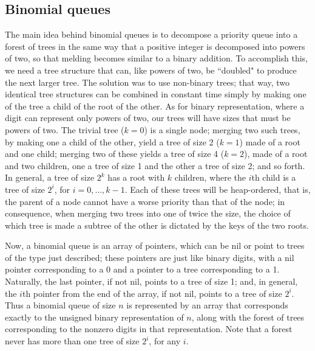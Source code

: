 \documentclass[11pt]{article}
\begin{document}
\subsection{Binomial queues}
The main idea behind binomial queues is to decompose a priority queue into
a forest of trees in the same way that a positive integer is decomposed into
powers of two, so that melding becomes similar to a binary addition.
To accomplish this, we need a tree structure that can, like powers of
two, be ``doubled" to produce the next larger tree.  The solution
was to use non-binary trees; that way, two identical tree structures
can be combined in constant time simply by making one of the tree a child
of the root of the other.  As for binary representation, where a digit
can represent only powers of two, our trees will have sizes that must be
powers of two.   The trivial tree ($k=0$) is a single node; merging two such
trees, by making one a child of the other, yield a tree of size 2 ($k=1$)
made of a root and one child; merging two of these yields a tree of size 4
($k=2$), made of a root and two children, one a tree of size 1 and the other
a tree of size 2; and so forth.  In general, a tree of size $2^k$ has a root
with $k$ children, where the $i$th child is a tree of size $2^i$,
for $i=0,\ldots,k-1$.  Each of these trees will be heap-ordered, that is,
the parent of a node cannot have a worse priority than that of the node;
in consequence, when merging two trees into one of twice the size, the choice
of which tree is made a subtree of the other is dictated by the keys of the
two roots.

Now, a binomial queue is an array of pointers, which can be nil or point
to trees of the type just described; these pointers are just like binary
digits, with a nil pointer corresponding to a 0 and a pointer to a tree
corresponding to a 1.  Naturally, the last pointer, if not nil, points
to a tree of size 1; and, in general, the $i$th pointer from the end of
the array, if not nil, points to a tree of size $2^i$.  Thus a binomial queue
of size $n$ is represented by an array that corresponds exactly to the
unsigned binary representation of $n$, along with the forest of trees
corresponding to the nonzero digits in that representation.
Note that a forest never has more than one tree of size $2^i$, for any $i$.
\end{document}
